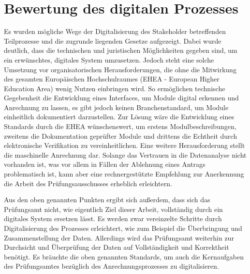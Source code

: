 \section{Bewertung des digitalen Prozesses}

Es wurden mögliche Wege der Digitalisierung des Stakeholder betreffenden Teilprozesse und die zugrunde liegenden Gesetze aufgezeigt. Dabei wurde deutlich, dass die technischen und juristischen Möglichkeiten gegeben sind, um ein erwünschtes, digitales System umzusetzen. Jedoch steht eine solche Umsetzung vor organisatorischen Herausforderungen, die ohne die Mitwirkung des gesamten Europäischen Hochschulraumes (EHEA - European Higher Education Area) wenig Nutzen einbringen wird. So ermöglichen technische Gegebenheit die Entwicklung eines Interfaces, um Module digital erkennen und Anrechnung zu lassen, es gibt jedoch keinen Branchenstandard, um Module einheitlich dokumentiert darzustellen.
Zur Lösung wäre die Entwicklung eines Standards durch die EHEA wünschenswert, um erstens Modulbeschreibungen, zweitens die Dokumentation geprüfter Module und drittens die Echtheit durch elektronische Verifikation zu vereinheitlichen.
Eine weitere Herausforderung stellt die maschinelle Anrechnung dar. Solange das Vertrauen in die Datenanalyse nicht vorhanden ist, was vor allem in Fällen der Ablehnung eines Antrags problematisch ist, kann aber eine rechnergestützte Empfehlung zur Anerkennung die Arbeit des Prüfungsausschusses erheblich erleichtern.

Aus den oben genannten Punkten ergibt sich außerdem, dass sich das Prüfungsamt nicht, wie eigentlich Ziel dieser Arbeit, vollständig durch ein digitales System ersetzen lässt. Es werden zwar vereinzelte Schritte durch Digitalisierung des Prozesses erleichtert, wie zum Beispiel die Überbringung und Zusammenstellung der Daten. Allerdings wird das Prüfungsamt weiterhin zur Durchsicht und Überprüfung der Daten auf Vollständigkeit und Korrektheit benötigt. Es bräuchte die oben genannten Standards, um auch die Kernaufgaben des Prüfungsamtes bezüglich des Anrechnungsprozesses zu digitalisieren.
